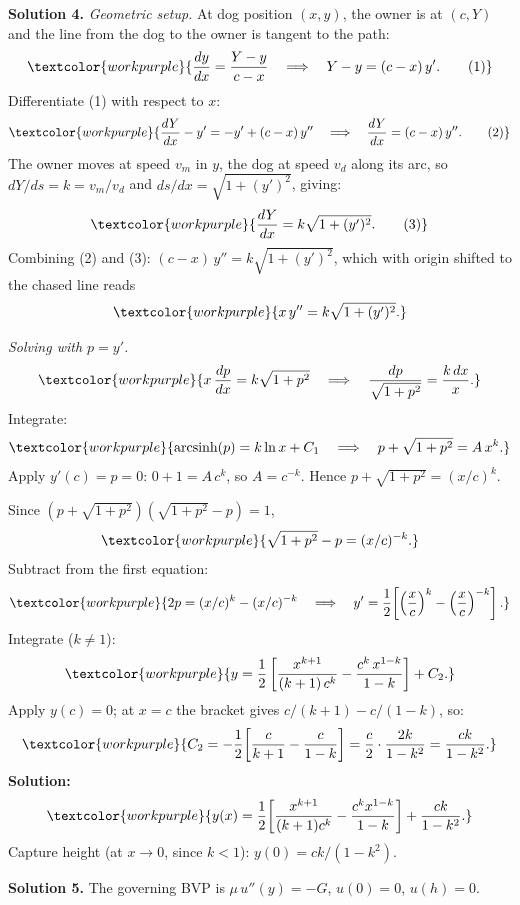 \medskip

\noindent\textbf{Solution 4.}\quad
\textit{Geometric setup.}
At dog position $(x,y)$, the owner is at $(c, Y)$ and the line from the
dog to the owner is tangent to the path:
\[
  \textcolor{workpurple}{\frac{dy}{dx} = \frac{Y - y}{c - x}
  \quad\Longrightarrow\quad Y - y = (c - x)\,y'. \tag{1}}
\]
Differentiate (1) with respect to $x$:
\[
  \textcolor{workpurple}{\frac{dY}{dx} - y' = -y' + (c-x)\,y''
  \quad\Longrightarrow\quad \frac{dY}{dx} = (c-x)\,y''. \tag{2}}
\]
The owner moves at speed $v_m$ in $y$, the dog at speed $v_d$ along its arc,
so $dY/ds = k = v_m/v_d$ and $ds/dx = \sqrt{1+(y')^2}$, giving:
\[
  \textcolor{workpurple}{\frac{dY}{dx} = k\sqrt{1+(y')^2}. \tag{3}}
\]
Combining (2) and (3): $(c-x)\,y'' = k\sqrt{1+(y')^2}$, which with origin
shifted to the chased line reads
\[
  \textcolor{workpurple}{x\,y'' = k\sqrt{1+(y')^2}.}
\]

\textit{Solving with $p = y'$.}
\[
  \textcolor{workpurple}{x\,\frac{dp}{dx} = k\sqrt{1+p^2}
  \quad\Longrightarrow\quad
  \frac{dp}{\sqrt{1+p^2}} = \frac{k\,dx}{x}.}
\]
Integrate:
\[
  \textcolor{workpurple}{\operatorname{arcsinh}(p) = k\ln x + C_1
  \quad\Longrightarrow\quad
  p + \sqrt{1+p^2} = A\,x^k.}
\]
Apply $y'(c) = p = 0$: $0 + 1 = A\,c^k$, so $A = c^{-k}$.
Hence $p + \sqrt{1+p^2} = (x/c)^k$.

Since $(p + \sqrt{1+p^2})({\sqrt{1+p^2} - p}) = 1$,
\[
  \textcolor{workpurple}{\sqrt{1+p^2} - p = (x/c)^{-k}.}
\]
Subtract from the first equation:
\[
  \textcolor{workpurple}{2p = (x/c)^k - (x/c)^{-k}
  \quad\Longrightarrow\quad
  y' = \frac{1}{2}\!\left[\left(\frac{x}{c}\right)^k
  - \left(\frac{x}{c}\right)^{-k}\right].}
\]
Integrate ($k \ne 1$):
\[
  \textcolor{workpurple}{y = \frac{1}{2}\left[\frac{x^{k+1}}{(k+1)\,c^k}
  - \frac{c^k\,x^{1-k}}{1-k}\right] + C_2.}
\]
Apply $y(c) = 0$; at $x = c$ the bracket gives $c/(k+1) - c/(1-k)$, so:
\[
  \textcolor{workpurple}{C_2 = -\frac{1}{2}\!\left[\frac{c}{k+1} - \frac{c}{1-k}\right]
  = \frac{c}{2}\cdot\frac{2k}{1-k^2} = \frac{ck}{1-k^2}.}
\]
\textbf{Solution:}
\[
  \textcolor{workpurple}{y(x) = \frac{1}{2}\!\left[\frac{x^{k+1}}{(k+1)c^k}
  - \frac{c^k x^{1-k}}{1-k}\right] + \frac{ck}{1-k^2}.}
\]
Capture height (at $x \to 0$, since $k < 1$): $y(0) = ck/(1-k^2)$.

\medskip

\noindent\textbf{Solution 5.}\quad
The governing BVP is $\mu\,u''(y) = -G$, $u(0) = 0$, $u(h) = 0$.

